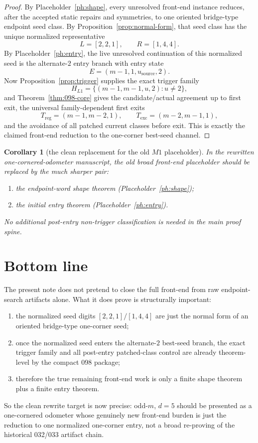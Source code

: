 \documentclass[11pt]{article}
\newtheorem{corollary}[theorem]{Corollary}
\begin{document}
\begin{proof}
By Placeholder~\ref{ph:shape}, every unresolved front-end instance reduces,
after the accepted static repairs and symmetries, to one oriented bridge-type
endpoint seed class.
By Proposition~\ref{prop:normal-form}, that seed class has the unique normalized
representative
\[
L=[2,2,1],\qquad R=[1,4,4].
\]
By Placeholder~\ref{ph:entry}, the live unresolved continuation of this
normalized seed is the alternate-$2$ entry branch with entry state
\[
E=(m-1,1,u_{\mathrm{source}},2).
\]
Now Proposition~\ref{prop:trigger} supplies the exact trigger family
\[
H_{L1}=\{(m-1,m-1,u,2):u\neq 2\},
\]
and Theorem~\ref{thm:098-core} gives the candidate/actual agreement up to first
exit, the universal family-dependent first exits
\[
T_{\mathrm{reg}}=(m-1,m-2,1),
\qquad
T_{\mathrm{exc}}=(m-2,m-1,1),
\]
and the avoidance of all patched current classes before exit.
This is exactly the claimed front-end reduction to the one-corner best-seed
channel.
\end{proof}

\begin{corollary}[the clean replacement for the old $M1$ placeholder]
\label{cor:M1-clean}
In the rewritten one-cornered-odometer manuscript, the old broad front-end
placeholder should be replaced by the much sharper pair:
\begin{enumerate}[label=\textup{(\arabic*)},leftmargin=2.5em]
\item the endpoint-word shape theorem
      (Placeholder~\ref{ph:shape});
\item the initial entry theorem
      (Placeholder~\ref{ph:entry}).
\end{enumerate}
No additional post-entry non-trigger classification is needed in the main proof
spine.
\end{corollary}

\section{Bottom line}

The present note does not pretend to close the full front-end from raw
endpoint-search artifacts alone.
What it does prove is structurally important:
\begin{enumerate}[label=\textup{(\arabic*)},leftmargin=2.5em]
\item the normalized seed digits $[2,2,1]/[1,4,4]$ are just the normal form of
      an oriented bridge-type one-corner seed;
\item once the normalized seed enters the alternate-$2$ best-seed branch, the
      exact trigger family and all post-entry patched-class control are already
      theorem-level by the compact \textup{098} package;
\item therefore the true remaining front-end work is only a finite shape
      theorem plus a finite entry theorem.
\end{enumerate}

So the clean rewrite target is now precise:
odd-$m$, $d=5$ should be presented as a one-cornered odometer whose genuinely
new front-end burden is just the reduction to one normalized one-corner entry,
not a broad re-proving of the historical \textup{032}/\textup{033} artifact
chain.
\end{document}
